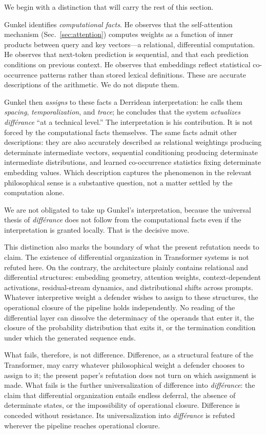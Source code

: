 \documentclass[a4paper,twocolumn,11pt]{article}
\begin{document}
We begin with a distinction that will carry the rest of this section.

Gunkel identifies \emph{computational facts}. He observes that the self-attention mechanism (Sec.~\ref{sec:attention}) computes weights as a function of inner products between query and key vectors---a relational, differential computation. He observes that next-token prediction is sequential, and that each prediction conditions on previous context. He observes that embeddings reflect statistical co-occurrence patterns rather than stored lexical definitions. These are accurate descriptions of the arithmetic. We do not dispute them.

Gunkel then \emph{assigns} to these facts a Derridean interpretation: he calls them \emph{spacing}, \emph{temporalization}, and \emph{trace}; he concludes that the system \emph{actualizes diff\'erance} ``at a technical level.'' The interpretation is his contribution. It is not forced by the computational facts themselves. The same facts admit other descriptions: they are also accurately described as relational weightings producing determinate intermediate vectors, sequential conditioning producing determinate intermediate distributions, and learned co-occurrence statistics fixing determinate embedding values. Which description captures the phenomenon in the relevant philosophical sense is a substantive question, not a matter settled by the computation alone.

We are not obligated to take up Gunkel's interpretation, because the universal thesis of \emph{diff\'erance} does not follow from the computational facts even if the interpretation is granted locally. That is the decisive move.

This distinction also marks the boundary of what the present refutation needs to claim. The existence of differential organization in Transformer systems is not refuted here. On the contrary, the architecture plainly contains relational and differential structures: embedding geometry, attention weights, context-dependent activations, residual-stream dynamics, and distributional shifts across prompts. Whatever interpretive weight a defender wishes to assign to these structures, the operational closure of the pipeline holds independently. No reading of the differential layer can dissolve the determinacy of the operands that enter it, the closure of the probability distribution that exits it, or the termination condition under which the generated sequence ends.

What fails, therefore, is not difference. Difference, as a structural feature of the Transformer, may carry whatever philosophical weight a defender chooses to assign to it; the present paper's refutation does not turn on which assignment is made. What fails is the further universalization of difference into \emph{diff\'erance}: the claim that differential organization entails endless deferral, the absence of determinate states, or the impossibility of operational closure. Difference is conceded without resistance. Its universalization into \emph{diff\'erance} is refuted wherever the pipeline reaches operational closure.
\end{document}
